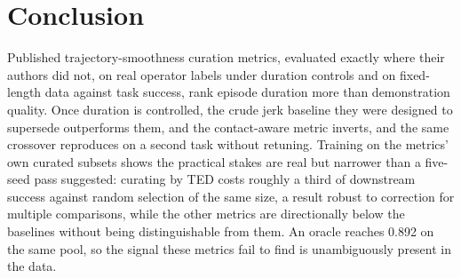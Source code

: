 \documentclass[10pt]{article}
\begin{document}
\section{Conclusion}

Published trajectory-smoothness curation metrics, evaluated exactly where
their authors did not, on real operator labels under duration controls and
on fixed-length data against task success, rank episode duration more than
demonstration quality. Once duration is controlled, the crude jerk baseline
they were designed to supersede outperforms them, and the contact-aware
metric inverts, and the same crossover reproduces on a second task without
retuning. Training on the metrics' own curated subsets shows the practical
stakes are real but narrower than a five-seed pass suggested: curating by
TED costs roughly a third of downstream success against random selection of
the same size, a result robust to correction for multiple comparisons, while
the other metrics are directionally below the baselines without being
distinguishable from them. An oracle reaches 0.892 on the same pool, so the
signal these metrics fail to find is unambiguously present in the data.
\end{document}
